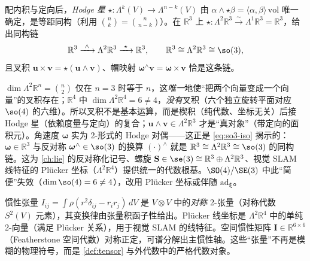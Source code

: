 \begin{theorem}\label{thm:hodge}
配内积与定向后，\emph{Hodge 星} $\star:\Lambda^k(V)\to\Lambda^{n-k}(V)$ 由 $\alpha\wedge\star\beta=\langle\alpha,\beta\rangle\,\mathrm{vol}$ 唯一确定，是等距同构（利用 $\binom{n}{k}=\binom{n}{n-k}$）。在 $\mathbb{R}^3$ 上 $\star:\Lambda^2\mathbb{R}^3\xrightarrow{\sim}\Lambda^1\mathbb{R}^3=\mathbb{R}^3$，给出同构链
\begin{equation}
  \mathbb{R}^3\xrightarrow{\ \wedge\ }\Lambda^2\mathbb{R}^3\xrightarrow{\ \star\ }\mathbb{R}^3,\qquad
  \mathbb{R}^3\cong\Lambda^2\mathbb{R}^3\cong\so(3),
  \label{eq:so3-iso}
\end{equation}
且叉积 $\mathbf{u}\times\mathbf{v}=\star(\mathbf{u}\wedge\mathbf{v})$、帽映射 $\boldsymbol{\omega}^\wedge\mathbf{v}=\boldsymbol{\omega}\times\mathbf{v}$ 恰是这条链。
\end{theorem}

\begin{insight}
$\dim\Lambda^2\mathbb{R}^n=\binom{n}{2}$ 仅在 $n=3$ 时等于 $n$，这\emph{唯一}地使“把两个向量变成一个向量”的叉积存在；$\mathbb{R}^4$ 中 $\dim\Lambda^2\mathbb{R}^4=6\neq4$，\emph{没有}叉积（六个独立旋转平面对应 $\so(4)$ 的六维）。所以叉积不是基本运算，而是楔积（纯代数、坐标无关）后接 Hodge 星（依赖度量与定向）的复合；$\mathbf{u}\wedge\mathbf{v}\in\Lambda^2\mathbb{R}^3$ 才是“真对象”（带定向的面积元）。角速度 $\boldsymbol{\omega}$ 实为 2-形式的 Hodge 对偶——这正是 \cref{eq:so3-iso} 揭示的：$\boldsymbol{\omega}\in\mathbb{R}^3$ 与反对称 $\boldsymbol{\omega}^\wedge\in\so(3)$ 的换算 $(\cdot)^\wedge$ 就是 $\mathbb{R}^3\cong\Lambda^2\mathbb{R}^3\cong\so(3)$ 的同构链。这为 \cref{ch:lie} 的反对称化记号、螺旋 $\mathbf{S}\in\se(3)\cong\mathbb{R}^3\oplus\Lambda^2\mathbb{R}^3$、视觉 SLAM 线特征的 Plücker 坐标（$\Lambda^2\mathbb{R}^4$）提供统一的代数根基。$\SO(4)/\SE(3)$ 中此“简便”失效（$\dim\so(4)=6\neq4$），改用 Plücker 坐标或伴随 $\mathrm{ad}_{\boldsymbol{\xi}}$。
\end{insight}

\begin{example}\label{ex:tensor-robot}
惯性张量 $I_{ij}=\int\rho(r^2\delta_{ij}-r_ir_j)\,dV$ 是 $V\otimes V$ 中的\emph{对称} 2-张量（对称代数 $S^2(V)$ 元素），其变换律由张量积函子性给出。Plücker 线坐标是 $\Lambda^2\mathbb{R}^4$ 中的单纯 2-向量（满足 Plücker 关系），用于视觉 SLAM 的线特征。空间惯性矩阵 $\mathbf{I}\in\mathbb{R}^{6\times6}$（Featherstone 空间代数）对称正定，可谱分解出主惯性轴。这些“张量”不再是模糊的物理符号，而是 \cref{def:tensor} 与外代数中的严格代数对象。
\end{example}

